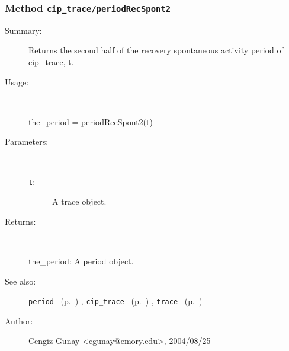 \subsubsection[Method \texttt{periodRecSpont2}]{Method \texttt{cip\_trace/periodRecSpont2}}%
%
\label{ref_cip_trace__periodRecSpont2}%
\hypertarget{ref_cip_trace__periodRecSpont2}{}%
\begin{description}
\item[Summary:]Returns the second half of the recovery spontaneous
		 activity period of cip\_trace, t. 
%
\item[Usage:]~%
\begin{lyxcode}%
the\_period = periodRecSpont2(t)
%
\end{lyxcode}%
%
%
\item[Parameters:]~
\begin{description}%
\item[\texttt{t}:]
 A trace object.
\end{description}%
%
\item[Returns:]~

	the\_period: A period object.
%
%
\item[See also:]%
\hyperlink{ref_period}{\texttt{period}}%
\ (p.~\pageref{ref_period})%
%
, \hyperlink{ref_cip_trace}{\texttt{cip\_trace}}%
\ (p.~\pageref{ref_cip_trace})%
%
, \hyperlink{ref_trace}{\texttt{trace}}%
\ (p.~\pageref{ref_trace})%
%
%
\item[Author:]%
Cengiz Gunay <cgunay@emory.edu>, 2004/08/25%
\end{description}
\methodline%

